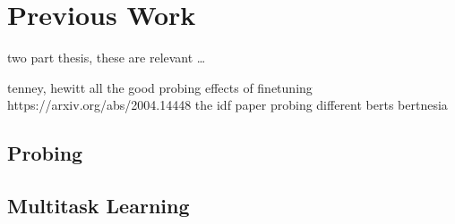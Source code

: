\chapter{Previous Work}
\label{chap:prev}
two part thesis, these are relevant \dots

tenney, hewitt all the good probing
effects of finetuning https://arxiv.org/abs/2004.14448
the idf paper
probing different berts
bertnesia

\section{Probing}
\section{Multitask Learning}
